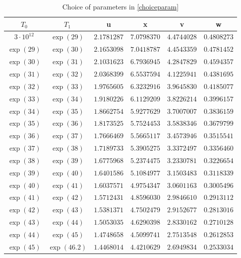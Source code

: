 \documentclass[reqno]{amsart}
\numberwithin{equation}{section}
\theoremstyle{remark}
\begin{document}
\begin{table}[h]
\def\arraystretch{1.3}
\centering
\caption{Choice of parameters in \eqref{choiceparam} }
\begin{tabular}{|c|c|c|c|c|c|}
\hline
$T_0$ & $T_1$ & u & x & v & w \\
\hline
$3\cdot 10^{12} $ & $\exp(29)$ & $2.1781287$ & $7.0798370$ & $4.4744028$ & $0.4808273$ \\
\hline
$\exp(29)$ & $\exp(30)$ & $2.1653098$ & $7.0418787$& $4.4543359$ & $0.4781452$\\
\hline
$\exp(30)$ & $\exp(31)$ & $2.1031623$ & $6.7936945$& $4.2847829$ & $0.4594357$\\
\hline
$\exp(31)$ & $\exp(32)$ & $2.0368399$ & $6.5537594$& $4.1225941$ & $0.4381695$\\
\hline
$\exp(32)$ & $\exp(33)$ & $1.9765605$ & $6.3232916$& $3.9645830$ & $0.4185077$\\
\hline
$\exp(33)$ & $\exp(34)$ & $1.9180226$ & $6.1129209$& $3.8226214$ & $0.3996157$\\
\hline
$\exp(34)$ & $\exp(35)$ & $1.8662754$ & $5.9277629$& $3.7007007$ & $0.3836159$\\
\hline
$\exp(35)$ & $\exp(36)$ & $1.8173525$ & $5.7524453$& $3.5838346$ & $0.3679799$\\
\hline
$\exp(36)$ & $\exp(37)$ & $1.7666469$ & $5.5665117$& $3.4573946$ & $0.3515541$\\
\hline
$\exp(37)$ & $\exp(38)$ & $1.7189733$ & $5.3905275$& $3.3372497$ & $0.3356460$\\
\hline
$\exp(38)$ & $\exp(39)$ & $1.6775968$ & $5.2374475$& $3.2330781$ & $0.3226654$\\
\hline
$\exp(39)$ & $\exp(40)$ & $1.6401586$ & $5.1084977$& $3.1503483$ & $0.3118339$\\
\hline
$\exp(40)$ & $\exp(41)$ & $1.6037571$ & $4.9754347$& $3.0601163$ & $0.3005496$\\
\hline
$\exp(41)$ & $\exp(42)$ & $1.5712431$ & $4.8596030$& $2.9846610$ & $0.2913112$\\
\hline
$\exp(42)$ & $\exp(43)$ & $1.5381371$ & $4.7502479$& $2.9152677$ & $0.2813016$\\
\hline
$\exp(43)$ & $\exp(44)$ & $1.5053035$ & $4.6290398$& $2.8330162$ & $0.2710128$\\
\hline
$\exp(44)$ & $\exp(45)$ & $1.4748658$ & $4.5099741$& $2.7513548$ & $0.2612853$\\
\hline
$\exp(45)$ & $\exp(46.2)$ & $1.4468014$ & $4.4210629$& $2.6949834$ & $0.2533034$\\

\end{tabular}
\end{table}
\end{document}
